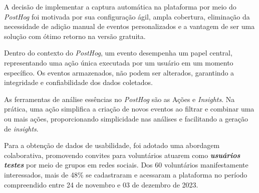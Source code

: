 A decisão de implementar a captura automática na plataforma por meio do \textit{PostHog} foi motivada por sua configuração ágil, ampla cobertura, eliminação da necessidade de adição manual de eventos personalizados e a vantagem de ser uma solução com ótimo retorno na versão gratuita.

Dentro do contexto do \textit{PostHog}, um evento desempenha um papel central, representando uma ação única executada por um usuário em um momento específico. Os eventos armazenados, não podem ser alterados, garantindo a integridade e confiabilidade dos dados coletados.

As ferramentas de análise essências no \textit{PostHog} são as Ações e \textit{Insights}. Na prática, uma ação simplifica a criação de novos eventos ao filtrar e combinar uma ou mais ações, proporcionando simplicidade nas análises e facilitando a geração de \textit{insights}.

Para a obtenção de dados de usabilidade, foi adotado uma abordagem colaborativa, promovendo convites para voluntários atuarem como \textit{\textbf{usuários testes}} por meio de grupos em redes sociais. Dos 60 voluntários manifestamente interessados, mais de 48\% se cadastraram e acessaram a plataforma no período compreendido entre 24 de novembro e 03 de dezembro de 2023.

